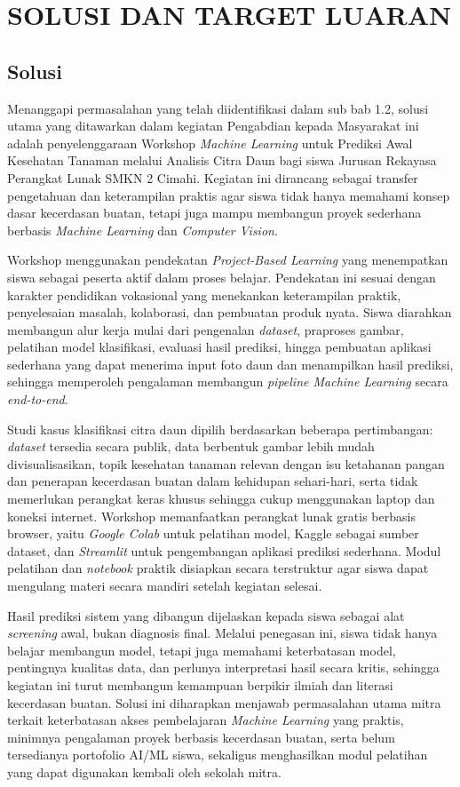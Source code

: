 \clearpage
\section{SOLUSI DAN TARGET LUARAN}

\subsection{Solusi}

Menanggapi permasalahan yang telah diidentifikasi dalam sub bab 1.2, solusi utama yang ditawarkan dalam kegiatan Pengabdian kepada Masyarakat ini adalah penyelenggaraan Workshop \textit{Machine Learning} untuk Prediksi Awal Kesehatan Tanaman melalui Analisis Citra Daun bagi siswa Jurusan Rekayasa Perangkat Lunak SMKN 2 Cimahi. Kegiatan ini dirancang sebagai transfer pengetahuan dan keterampilan praktis agar siswa tidak hanya memahami konsep dasar kecerdasan buatan, tetapi juga mampu membangun proyek sederhana berbasis \textit{Machine Learning} dan \textit{Computer Vision}.

Workshop menggunakan pendekatan \textit{Project-Based Learning} yang menempatkan siswa sebagai peserta aktif dalam proses belajar. Pendekatan ini sesuai dengan karakter pendidikan vokasional yang menekankan keterampilan praktik, penyelesaian masalah, kolaborasi, dan pembuatan produk nyata. Siswa diarahkan membangun alur kerja mulai dari pengenalan \textit{dataset}, praproses gambar, pelatihan model klasifikasi, evaluasi hasil prediksi, hingga pembuatan aplikasi sederhana yang dapat menerima input foto daun dan menampilkan hasil prediksi, sehingga memperoleh pengalaman membangun \textit{pipeline Machine Learning} secara \textit{end-to-end}.

Studi kasus klasifikasi citra daun dipilih berdasarkan beberapa pertimbangan: \textit{dataset} tersedia secara publik, data berbentuk gambar lebih mudah divisualisasikan, topik kesehatan tanaman relevan dengan isu ketahanan pangan dan penerapan kecerdasan buatan dalam kehidupan sehari-hari, serta tidak memerlukan perangkat keras khusus sehingga cukup menggunakan laptop dan koneksi internet. Workshop memanfaatkan perangkat lunak gratis berbasis browser, yaitu \textit{Google Colab} untuk pelatihan model, Kaggle sebagai sumber dataset, dan \textit{Streamlit} untuk pengembangan aplikasi prediksi sederhana. Modul pelatihan dan \textit{notebook} praktik disiapkan secara terstruktur agar siswa dapat mengulang materi secara mandiri setelah kegiatan selesai.

Hasil prediksi sistem yang dibangun dijelaskan kepada siswa sebagai alat \textit{screening} awal, bukan diagnosis final. Melalui penegasan ini, siswa tidak hanya belajar membangun model, tetapi juga memahami keterbatasan model, pentingnya kualitas data, dan perlunya interpretasi hasil secara kritis, sehingga kegiatan ini turut membangun kemampuan berpikir ilmiah dan literasi kecerdasan buatan. Solusi ini diharapkan menjawab permasalahan utama mitra terkait keterbatasan akses pembelajaran \textit{Machine Learning} yang praktis, minimnya pengalaman proyek berbasis kecerdasan buatan, serta belum tersedianya portofolio AI/ML siswa, sekaligus menghasilkan modul pelatihan yang dapat digunakan kembali oleh sekolah mitra.

